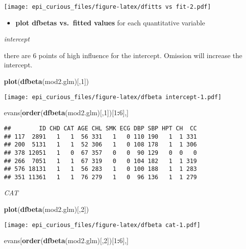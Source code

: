 \documentclass[
]{article}
\newenvironment{Shaded}{\begin{snugshade}}{\end{snugshade}}
\newcommand{\DecValTok}[1]{\textcolor[rgb]{0.00,0.00,0.81}{#1}}
\newcommand{\KeywordTok}[1]{\textcolor[rgb]{0.13,0.29,0.53}{\textbf{#1}}}
\newcommand{\NormalTok}[1]{#1}
\newcommand{\OperatorTok}[1]{\textcolor[rgb]{0.81,0.36,0.00}{\textbf{#1}}}
\providecommand{\tightlist}{%
  \setlength{\itemsep}{0pt}\setlength{\parskip}{0pt}}
\begin{document}
\texttt{[image: epi\_curious\_files/figure-latex/dfitts vs fit-2.pdf]}

\begin{itemize}
\tightlist
\item
  \textbf{plot dfbetas vs.~fitted values} for each quantitative variable
\end{itemize}

\emph{intercept}

there are 6 points of high influence for the intercept. Omission will
increase the intercept.

\begin{Shaded}
\begin{Highlighting}[]
\KeywordTok{plot}\NormalTok{(}\KeywordTok{dfbeta}\NormalTok{(mod2.glm)[,}\DecValTok{1}\NormalTok{])}
\end{Highlighting}
\end{Shaded}

\texttt{[image: epi\_curious\_files/figure-latex/dfbeta intercept-1.pdf]}

\begin{Shaded}
\begin{Highlighting}[]
\NormalTok{evans[}\KeywordTok{order}\NormalTok{(}\KeywordTok{dfbeta}\NormalTok{(mod2.glm)[,}\DecValTok{1}\NormalTok{])[}\DecValTok{1}\OperatorTok{:}\DecValTok{6}\NormalTok{],]}
\end{Highlighting}
\end{Shaded}

\begin{verbatim}
##        ID CHD CAT AGE CHL SMK ECG DBP SBP HPT CH  CC
## 117  2891   1   1  56 331   1   0 110 190   1  1 331
## 200  5131   1   1  52 306   1   0 108 178   1  1 306
## 378 12051   1   0  67 357   0   0  90 129   0  0   0
## 266  7051   1   1  67 319   0   0 104 182   1  1 319
## 576 18131   1   1  56 283   1   0 100 188   1  1 283
## 351 11361   1   1  76 279   1   0  96 136   1  1 279
\end{verbatim}

\emph{CAT}

\begin{Shaded}
\begin{Highlighting}[]
\KeywordTok{plot}\NormalTok{(}\KeywordTok{dfbeta}\NormalTok{(mod2.glm)[,}\DecValTok{2}\NormalTok{])}
\end{Highlighting}
\end{Shaded}

\texttt{[image: epi\_curious\_files/figure-latex/dfbeta cat-1.pdf]}

\begin{Shaded}
\begin{Highlighting}[]
\NormalTok{evans[}\KeywordTok{order}\NormalTok{(}\KeywordTok{dfbeta}\NormalTok{(mod2.glm)[,}\DecValTok{2}\NormalTok{])[}\DecValTok{1}\OperatorTok{:}\DecValTok{6}\NormalTok{],]}
\end{Highlighting}
\end{Shaded}
\end{document}

